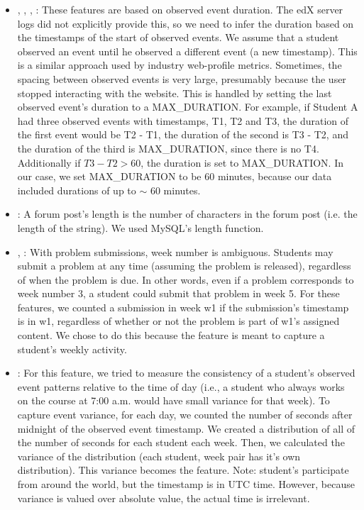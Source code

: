 

\begin{itemize}

\item {}, , , : These features are based on observed event duration. The edX server logs did not explicitly provide this, so we need to infer the duration based on the timestamps of the start of observed events. We assume that a student observed an event until he observed a different event (a new timestamp). This is a similar approach used by industry web-profile metrics. Sometimes, the spacing between observed events is very large, presumably because the user stopped interacting with the website. This is handled by setting the last observed event's duration to a MAX\_DURATION. For example, if Student A had three observed events with timestamps, T1, T2 and T3, the duration of the first event would be T2 - T1, the duration of the second is T3 - T2, and the duration of the third is MAX\_DURATION, since there is no T4. Additionally if $T3 - T2 > 60$, the duration is set to MAX\_DURATION. In our case, we set MAX\_DURATION to be 60 minutes, because our data included durations of up to $\sim$ 60 minutes.

\item {}: A forum post's length is the number of characters in the forum post (i.e. the length of the string). We used MySQL's length function.

\item {}, : With problem submissions, week number is ambiguous. Students may submit a problem at any time (assuming the problem is released), regardless of when the problem is due. In other words, even if a problem corresponds to week number 3, a student could submit that problem in week 5. For these features, we counted a submission in week w1 if the submission's timestamp is in w1, regardless of whether or not the problem is part of w1's assigned content.  We chose to do this because the feature is meant to capture a student's weekly activity.

\item {}: For this feature, we tried to measure the consistency of a student's observed event patterns relative to the time of day (i.e., a student who always works on the course at 7:00 a.m. would have small variance for that week). To capture event variance, for each day, we counted the number of seconds after midnight of the observed event timestamp. We created a distribution of all of the number of seconds for each student each week. Then, we calculated the variance of the distribution (each student, week pair has it's own distribution). This variance becomes the feature. Note: student's participate from around the world, but the timestamp is in UTC time. However, because variance is valued over absolute value, the actual time is irrelevant. 

\end{itemize}

